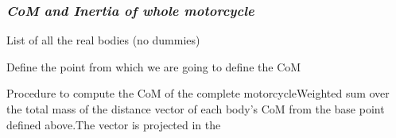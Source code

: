 \documentclass{article}
\begin{document}
\subsubsection{\textit{CoM and Inertia of whole motorcycle}}
\begin{maplegroup}
\begin{Maple Normal}{
List of all the real bodies (no dummies)}\end{Maple Normal}

\end{maplegroup}
\begin{maplegroup}
\begin{mapleinput}
\end{mapleinput}
\mapleresult
\begin{maplelatex}
\end{maplelatex}
\end{maplegroup}
\begin{maplegroup}
\begin{Maple Normal}{
Define the point from which we are going to define the CoM}\end{Maple Normal}

\end{maplegroup}
\begin{maplegroup}
\begin{mapleinput}
\end{mapleinput}
\end{maplegroup}
\begin{maplegroup}
\begin{Maple Normal}{
Procedure to compute the CoM of the complete motorcycleWeighted sum over the total mass of the distance vector of each body's CoM from the base point defined above.The vector is projected in the}\end{Maple Normal}

\end{maplegroup}
\begin{maplegroup}
\begin{mapleinput}
\end{mapleinput}
\end{maplegroup}
\end{document}
